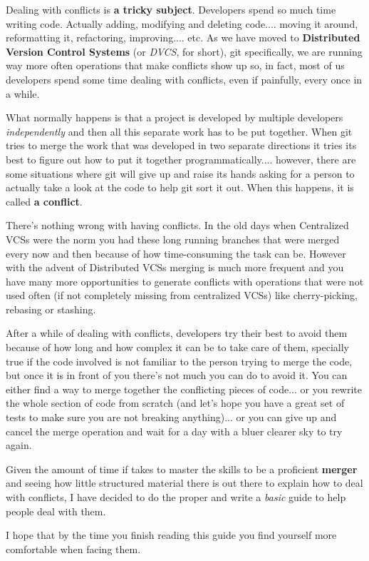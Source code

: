 Dealing with conflicts is {\bf a tricky subject}. Developers spend so much time writing code. Actually adding,
modifying and deleting code.... moving it around, reformatting it, refactoring, improving.... etc. As we have moved
to {\bf Distributed Version Control Systems} (or {\it DVCS}, for short), git specifically, we are running way more often
operations that make conflicts show up so, in fact, most of us developers spend some time dealing with conflicts, even
if painfully, every once in a while.

What normally happens is that a project is developed by multiple developers {\it independently} and then all this separate work
has to be put together. When git tries to merge the work that was developed in two separate directions it tries its best to figure
out how to put it together programmatically.... however, there are some situations where git will give up and raise its hands asking
for a person to actually take a look at the code to help git sort it out. When this happens, it is called {\bf a conflict}.

There's nothing wrong with having conflicts. In the old days when Centralized VCSs were the norm you had these long running branches
that were merged every now and then because of how time-consuming the task can be. However with the advent of Distributed VCSs
merging is much more frequent and you have many more opportunities to generate conflicts with operations that were not used often
(if not completely missing from centralized VCSs) like cherry-picking, rebasing or stashing.

After a while of dealing with conflicts, developers try their best to avoid them because of how long and how complex it can be to
take care of them, specially true if the code involved is not familiar to the person trying to merge the code, but once it is in
front of you there's not much you can do to avoid it. You can either find a way to merge together the conflicting pieces of code...
or you rewrite the whole section of code from scratch (and let's hope you have a great set of tests to make sure you are not breaking
anything)... or you can give up and cancel the merge operation and wait for a day with a bluer clearer sky to try again.

Given the amount of time if takes to master the skills to be a proficient {\bf merger} and seeing how little structured material there
is out there to explain how to deal with conflicts, I have decided to do the proper and write a {\it basic} guide to help people deal
with them.

I hope that by the time you finish reading this guide you find yourself more comfortable when facing them.

